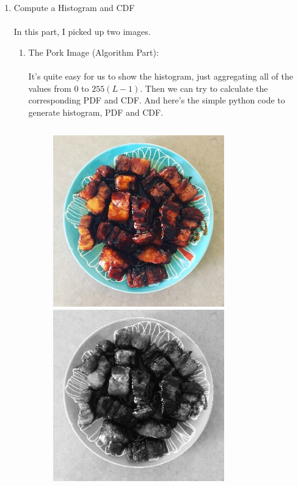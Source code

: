\documentclass{article}
\begin{document}
\begin{enumerate}[label=B\arabic*)]
	\item Compute a Histogram and CDF 
		\\
		\\
		In this part, I picked up two images.
		\begin{enumerate}[label=\arabic*)]
			\item The Pork Image (Algorithm Part):
				\\
				\\
				It's quite easy for us to show the histogram, just aggregating all of the values from $0$ to $255 (L-1)$. Then we can try to calculate the corresponding PDF and CDF. And here's the simple python code to generate histogram, PDF and CDF.
				\\
				\inputminted[tabsize=4, linenos]{Python}{hist.py}
				\begin{figure}[h!]
					\begin{minipage}{0.48\textwidth}
						\centering
						\includegraphics[width=20em]{Pork/Original.jpg}
					\end{minipage}
					\hfill
					\begin{minipage}{0.48\textwidth}
						\centering
						\includegraphics[width=20em]{Pork/Gray.png}

\end{minipage}
\end{figure}
\end{enumerate}
\end{enumerate}
\end{document}
